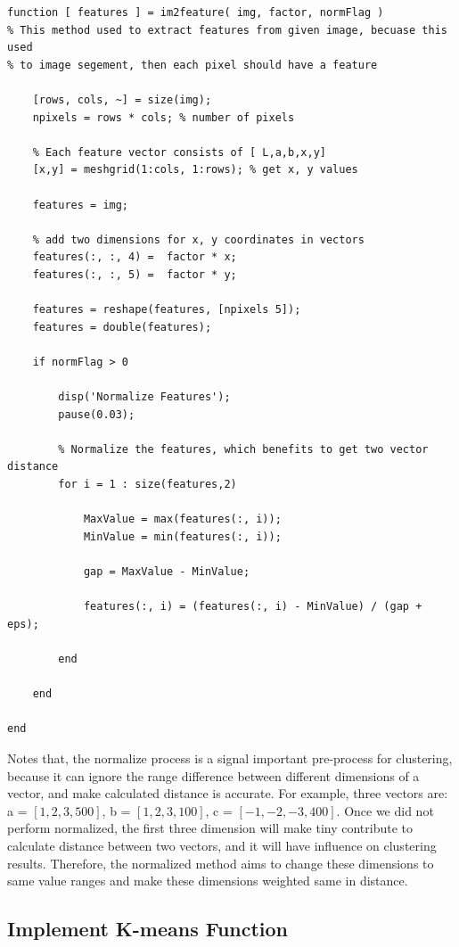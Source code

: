 \documentclass[12pt]{article}
\begin{document}
\begin{lstlisting}
function [ features ] = im2feature( img, factor, normFlag )
% This method used to extract features from given image, becuase this used
% to image segement, then each pixel should have a feature

    [rows, cols, ~] = size(img);
    npixels = rows * cols; % number of pixels

    % Each feature vector consists of [ L,a,b,x,y]
    [x,y] = meshgrid(1:cols, 1:rows); % get x, y values
    
    features = img;
    
    % add two dimensions for x, y coordinates in vectors
    features(:, :, 4) =  factor * x;
    features(:, :, 5) =  factor * y;
    
    features = reshape(features, [npixels 5]);
    features = double(features);
    
    if normFlag > 0
        
        disp('Normalize Features');
        pause(0.03);
        
        % Normalize the features, which benefits to get two vector distance
        for i = 1 : size(features,2)

            MaxValue = max(features(:, i));
            MinValue = min(features(:, i));

            gap = MaxValue - MinValue;

            features(:, i) = (features(:, i) - MinValue) / (gap + eps);

        end
        
    end

end
\end{lstlisting}

Notes that, the normalize process is a signal important pre-process for clustering, because it can ignore the range difference between different dimensions of a vector, and make calculated distance is accurate. For example, three vectors are: a = $[1, 2, 3, 500]$,  b = $[1, 2, 3, 100]$, c =  $[-1, -2, -3, 400]$. Once we did not perform normalized, the first three dimension will make tiny contribute to calculate distance between two vectors, and it will have influence on clustering results. Therefore, the normalized method aims to change these dimensions to same value ranges and make these dimensions weighted same in distance. 

\subsection{Implement K-means Function}
\end{document}
